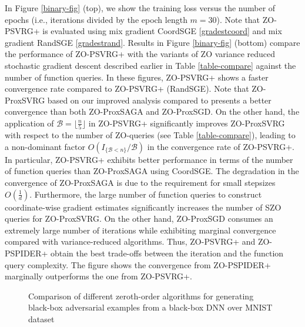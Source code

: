 \documentclass[iicol,sn-basic]{sn-jnl}
\theoremstyle{thmstyleone}%
\theoremstyle{thmstyletwo}%
\theoremstyle{thmstylethree}%
\begin{document}
In Figure \ref{binary-fig} (top), we show the training loss versus the number of epochs (i.e., iterations divided by the
epoch length $m = 30$). Note that ZO-PSVRG+ is evaluated using mix gradient CoordSGE \eqref{gradestcoord} and mix gradient RandSGE \eqref{gradestrand}.
Results in Figure \ref{binary-fig} (bottom) compare the performance of ZO-PSVRG+ with the variants of ZO variance reduced stochastic gradient descent described earlier in Table \ref{table-compare} against the number of function queries. In these figures, ZO-PSVRG+  shows a faster convergence rate compared to ZO-PSVRG+ (RandSGE). Note that ZO-ProxSVRG based on
our improved analysis compared to \cite{huang2019faster} presents a better convergence than both ZO-ProxSAGA and  ZO-ProxSGD. On the other hand, the application of $\mathcal{B} = \lfloor{\frac{n}{5}}\rfloor$ in ZO-PSVRG+ significantly
improves ZO-ProxSVRG with respect to the number of ZO-queries (see Table \ref{table-compare}), leading to a non-dominant factor $O(I_{\{\mathcal{B} < n\}}/\mathcal{B})$ in the convergence rate of ZO-PSVRG+. In particular, ZO-PSVRG+ exhibits better performance in terms of the number of function queries than ZO-ProxSAGA using CoordSGE.  The degradation in the convergence of ZO-ProxSAGA is due to the requirement for small stepsizes $O(\frac{1}{d})$. Furthermore, the large number of function queries to construct
coordinate-wise gradient estimates significantly increases the number of SZO queries for ZO-ProxSVRG. On the other hand, ZO-ProxSGD consumes an extremely large number of iterations while exhibiting marginal convergence compared with variance-reduced algorithms. Thus, ZO-PSVRG+ and ZO-PSPIDER+ obtain the best trade-offs between the iteration and the function query complexity. The figure shows the convergence from ZO-PSPIDER+ marginally outperforms the one from ZO-PSVRG+.
\begin{figure}[hbt!]
\hfill%
%
\setlength{\abovecaptionskip}{2pt}
\caption{Comparison of different zeroth-order algorithms for generating black-box adversarial examples from a black-box DNN over MNIST dataset}
\label{attack-fig}
\end{figure}
\end{document}
